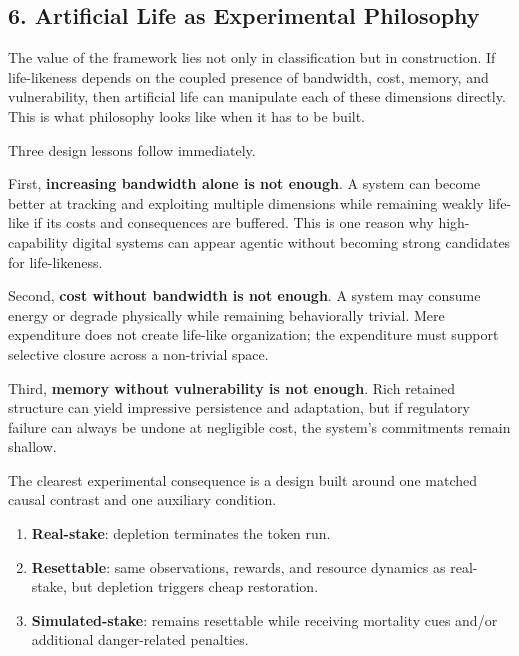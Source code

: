 \documentclass[Afour,sageh,times,doublespace]{sagej}
\providecommand{\tightlist}{\setlength{\itemsep}{0pt}\setlength{\parskip}{0pt}}
\begin{document}
\subsection{6. Artificial Life as Experimental Philosophy}\label{artificial-life-as-experimental-philosophy}

The value of the framework lies not only in classification but in construction. If life-likeness depends on the coupled presence of bandwidth, cost, memory, and vulnerability, then artificial life can manipulate each of these dimensions directly. This is what philosophy looks like when it has to be built.

Three design lessons follow immediately.

First, \textbf{increasing bandwidth alone is not enough}. A system can become better at tracking and exploiting multiple dimensions while remaining weakly life-like if its costs and consequences are buffered. This is one reason why high-capability digital systems can appear agentic without becoming strong candidates for life-likeness.

Second, \textbf{cost without bandwidth is not enough}. A system may consume energy or degrade physically while remaining behaviorally trivial. Mere expenditure does not create life-like organization; the expenditure must support selective closure across a non-trivial space.

Third, \textbf{memory without vulnerability is not enough}. Rich retained structure can yield impressive persistence and adaptation, but if regulatory failure can always be undone at negligible cost, the system's commitments remain shallow.

The clearest experimental consequence is a design built around one matched causal contrast and one auxiliary condition.

\begin{enumerate}
\def\labelenumi{\arabic{enumi}.}
\tightlist
\item
  \textbf{Real-stake}: depletion terminates the token run.
\item
  \textbf{Resettable}: same observations, rewards, and resource dynamics as real-stake, but depletion triggers cheap restoration.
\item
  \textbf{Simulated-stake}: remains resettable while receiving mortality cues and/or additional danger-related penalties.
\end{enumerate}
\end{document}
